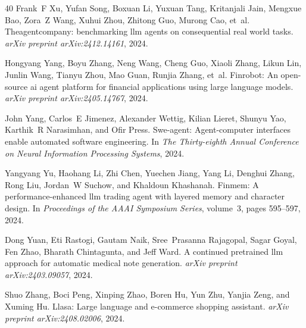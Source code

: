 \begin{thebibliography}{40}
Frank~F Xu, Yufan Song, Boxuan Li, Yuxuan Tang, Kritanjali Jain, Mengxue Bao, Zora~Z Wang, Xuhui Zhou, Zhitong Guo, Murong Cao, et~al.
\newblock Theagentcompany: benchmarking llm agents on consequential real world tasks.
\newblock \emph{arXiv preprint arXiv:2412.14161}, 2024.

Hongyang Yang, Boyu Zhang, Neng Wang, Cheng Guo, Xiaoli Zhang, Likun Lin, Junlin Wang, Tianyu Zhou, Mao Guan, Runjia Zhang, et~al.
\newblock Finrobot: An open-source ai agent platform for financial applications using large language models.
\newblock \emph{arXiv preprint arXiv:2405.14767}, 2024{}.

John Yang, Carlos~E Jimenez, Alexander Wettig, Kilian Lieret, Shunyu Yao, Karthik~R Narasimhan, and Ofir Press.
\newblock Swe-agent: Agent-computer interfaces enable automated software engineering.
\newblock In \emph{The Thirty-eighth Annual Conference on Neural Information Processing Systems}, 2024{}.

Yangyang Yu, Haohang Li, Zhi Chen, Yuechen Jiang, Yang Li, Denghui Zhang, Rong Liu, Jordan~W Suchow, and Khaldoun Khashanah.
\newblock Finmem: A performance-enhanced llm trading agent with layered memory and character design.
\newblock In \emph{Proceedings of the AAAI Symposium Series}, volume~3, pages 595--597, 2024.

Dong Yuan, Eti Rastogi, Gautam Naik, Sree~Prasanna Rajagopal, Sagar Goyal, Fen Zhao, Bharath Chintagunta, and Jeff Ward.
\newblock A continued pretrained llm approach for automatic medical note generation.
\newblock \emph{arXiv preprint arXiv:2403.09057}, 2024.

Shuo Zhang, Boci Peng, Xinping Zhao, Boren Hu, Yun Zhu, Yanjia Zeng, and Xuming Hu.
\newblock Llasa: Large language and e-commerce shopping assistant.
\newblock \emph{arXiv preprint arXiv:2408.02006}, 2024{}.


\end{thebibliography}
